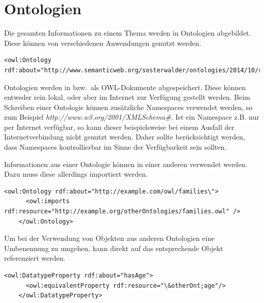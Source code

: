\newpage

\section{Ontologien}
\label{sec:owl_owl_Ontologien}

Die gesamten Informationen zu einem Thema werden in Ontologien abgebildet. Diese können von verschiedenen Anwendungen genutzt werden.

\begin{lstlisting}[caption={Beispiel einer Definition einer Ontologie}]
    <owl:Ontology rdf:about="http://www.semanticweb.org/sosterwalder/ontologies/2014/10/reiseplaner"/>
\end{lstlisting}

Ontologien werden in bzw.\ als OWL-Dokumente abgespeichert. Diese können entweder rein lokal, oder aber im Internet zur Verfügung gestellt werden.
Beim Schreiben einer Ontologie können zusätzliche Namespaces verwendet werden, so zum Beispiel \textit{http://www.w3.org/2001/XMLSchema\#}. Ist ein Namespace z.B. nur per Internet verfügbar, so kann dieser beispielsweise bei einem Ausfall der Internetverbindung nicht genutzt werden. Daher sollte berücksichtigt werden, dass Namespaces kontrollierbar im Sinne der Verfügbarkeit sein sollten.

Informationen aus einer Ontologie können in einer anderen verwendet werden. Dazu muss diese allerdings importiert werden.

\begin{lstlisting}[caption={Beispiel eines Importes einer Ontologie}]
    <owl:Ontology rdf:about="http://example.com/owl/families\">
      <owl:imports rdf:resource="http://example.org/otherOntologies/families.owl" />
    </owl:Ontology>
\end{lstlisting}


Um bei der Verwendung von Objekten aus anderen Ontologien eine Umbenennung zu umgehen, kann direkt auf das entsprechende Objekt referenziert werden.

\begin{lstlisting}[caption={Beispiel einer Referenzierung auf ein Objekt einer externen Ontologie}]
    <owl:DatatypeProperty rdf:about="hasAge">
      <owl:equivalentProperty rdf:resource="\&otherOnt;age"/>
    </owl:DatatypeProperty>
\end{lstlisting}

